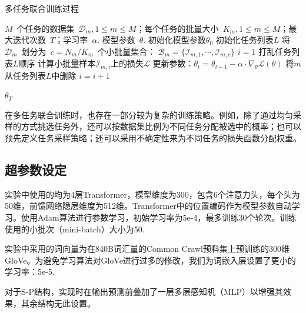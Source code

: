 \begin{algorithm}
	\caption{多任务联合训练过程}
	\label{alg:train}
	\begin{algorithmic}[1]
		\Require $M$~个任务的数据集~$\mathcal{D}_m, 1\le m \le M$；每个任务的批量大小~$K_m, 1\le m \le M$；最大迭代次数~$T$；学习率~$\alpha$.
		\Ensure 模型参数~$\theta$.
		\State 初始化模型参数$\theta_0$
		\State 初始化任务列表$L$
				\State 将~$\mathcal{D}_m$~划分为~$c=N_m/K_m$~个小批量集合：
				$\mathcal{B}_m = \{ \mathcal{I}_{m,1},\cdots, \mathcal{I}_{m,c} \}$
			\EndFor
			\State $i = 1$
			\State 打乱任务列表$L$顺序
			\State 计算小批量样本$\mathcal{I}_{m,i}$上的损失$\mathcal{L}$
			\State 更新参数：$\theta_t = \theta_{t-1}-\alpha \cdot \nabla_\theta \mathcal{L}(\theta) $
			\Else 
			\State 将$m$从任务列表$L$中删除
			\EndIf
			\EndFor
			\State $i = i + 1$
			\EndWhile

		\EndFor
		\State \Return $\theta_T$
		\EndFunction
	\end{algorithmic}
\end{algorithm}

在多任务联合训练时，也存在一部分较为复杂的训练策略。例如，除了通过均匀采样的方式挑选任务外，还可以按数据集比例为不同任务分配被选中的概率\cite{sanh2018hierarchical}；也可以预先定义任务采样策略\cite{DBLP:journals/tacl/KiperwasserB18}；还可以采用不确定性来为不同任务的损失函数分配权重\cite{DBLP:conf/cvpr/KendallGC18}。

\subsection{超参数设定}
实验中使用的均为4层Transformer，模型维度为300，包含6个注意力头，每个头为50维，前馈网络隐层维度为512维。Transformer中的位置编码作为模型参数自动学习。使用Adam算法\cite{kingma2015adam}进行参数学习，初始学习率为5e-4，最多训练30个轮次。训练使用的小批次（mini-batch）大小为50. 

实验中采用的词向量为在840B词汇量的Common Crawl预料集上预训练的300维GloVe\cite{DBLP:conf/emnlp/PenningtonSM14}。为避免学习算法对GloVe进行过多的修改，我们为词嵌入层设置了更小的学习率：5e-5.

对于S-P结构，实现时在输出预测前叠加了一层多层感知机（MLP）以增强其效果，其余结构无此设置。

